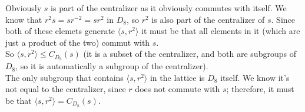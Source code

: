 \documentclass[12pt]{article}
\newcommand{\ang}[1]{\langle #1 \rangle}
\begin{document}
    Obviously $s$ is part of the centralizer
    as it obviously commutes with itself.
    We know that $r^2s = sr^{-2} = sr^2$ in $D_8$,
    so $r^2$ is also part of the centralizer of $s$.
    Since both of these elemets generate $\ang{s, r^2}$
    it must be that all elements in it
    (which are just a product of the two)
    commut with $s$. \\
    So $\ang{s, r^2} \leqslant C_{D_8}(s)$
    (it is a subset of the centralizer,
    and both are subgroups of $D_8$,
    so it is automatically a subgroup of the centralizer). \\
    The only subgroup that contains $\ang{s, r^2}$
    in the lattice is $D_8$ itself.
    We know it's not equal to the centralizer,
    since $r$ does not commute with $s$;
    therefore, it must be that $\ang{s, r^2} = C_{D_8}(s)$. \\
\end{document}
